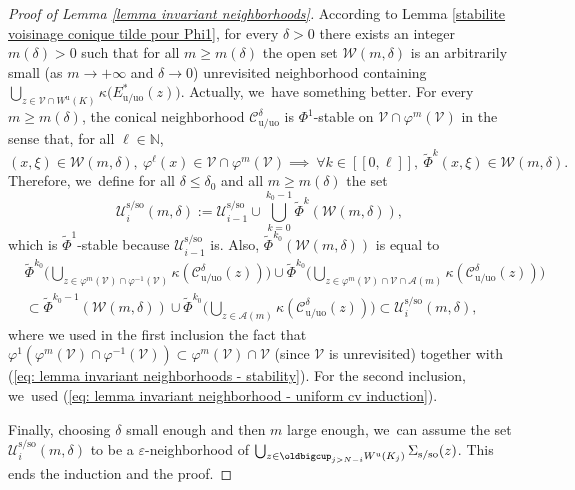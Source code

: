 \documentclass[JEP,XML,SOM,Unicode,NoEqCountersInSection,NoFloatCountersInSection,published]{cedram}
\newcommand{\lcr}{[\![}
\newcommand{\rcr}{]\!]}
\newcommand{\rs}{\mathrm{s}}
\newcommand{\rso}{\mathrm{so}}
\newcommand{\ru}{\mathrm{u}}
\newcommand{\ruo}{\mathrm{uo}}
\theoremstyle{definition}
\theoremstyle{plain}
\newcommand{\Acal}{\mathcal{A}}
\newcommand{\Ccal}{\mathcal{C}}
\newcommand{\N}{\mathbb{N}}
\newcommand{\Ucal}{\mathcal{U}}
\newcommand{\Vcal}{\mathcal{V}}
\newcommand{\Wcal}{\mathcal{W}}
\begin{document}
\begin{proof}[Proof of Lemma \ref{lemma invariant neighborhoods}]
According to Lemma \ref{stabilite voisinage conique tilde pour Phi1}, for every $\delta > 0$ there exists an integer $m(\delta) > 0$ such that for all $m \geq m (\delta)$ the open set $\Wcal(m,\delta)$ is an arbitrarily small (as $m \to + \infty$ and $\delta \to 0$) unrevisited neighborhood containing $\bigcup_{z \in \Vcal\cap W^\ru (K)} \kappa \bigl(E_{\ru/\ruo}^* (z) \bigr)$. Actually, we~have something better. For every $m \geq m(\delta)$, the conical neighborhood $\Ccal_{\ru/\ruo}^{\delta}$ is $\Phi^1$-stable on $\Vcal \cap \varphi^m (\Vcal)$ in the sense that, for all $\ell \in \N$,
\begin{equation}\label{eq: lemma invariant neighborhoods - stability}
(x,\xi) \in \Wcal (m,\delta), \: \varphi^{\ell} (x) \in \Vcal \cap \varphi^{m} (\Vcal) \implies \: \forall k \in \lcr0, \ell \rcr, \: \widetilde{\Phi}^k (x,\xi) \in \Wcal (m,\delta).
\end{equation}
Therefore, we~define for all $\delta \leq \delta_0$ and all $m \geq m (\delta)$ the set
\[
\Ucal_i^{\rs/\rso} (m,\delta):= \Ucal_{i-1}^{\rs/\rso} \cup \bigcup_{k = 0}^{k_0 - 1} \widetilde{\Phi}^k (\Wcal (m,\delta)),
\]
which is $\widetilde{\Phi}^1$-stable because $\Ucal_{i-1}^{\rs/\rso}$ is. Also, $\widetilde{\Phi}^{k_0} (\Wcal (m,\delta))$ is equal to
\begin{align*}
& \widetilde{\Phi}^{k_0 } \biggl(\bigcup_{z \in \varphi^{m} (\Vcal) \cap \varphi^{-1} (\Vcal)} \kappa (\Ccal_{\ru/\ruo}^{\delta}(z)) \biggr) \cup \widetilde{\Phi}^{k_0} \biggl(\bigcup_{z \in \varphi^m (\Vcal) \cap \Vcal \cap \Acal (m)} \kappa (\Ccal_{\ru/\ruo}^{\delta}(z)) \biggr) \\
&\subset \widetilde{\Phi}^{k_0 -1} \left(\Wcal (m,\delta) \right) \cup \widetilde{\Phi}^{k_0} \biggl(\bigcup_{z \in \Acal (m)} \kappa (\Ccal_{\ru/\ruo}^{\delta}(z)) \biggr) \subset \Ucal_i^{\rs/\rso} (m,\delta),
\end{align*}
where we used in the first inclusion the fact that $\varphi^{1} (\varphi^m (\Vcal) \cap \varphi^{-1} (\Vcal)) \subset \varphi^m (\Vcal) \cap \Vcal$ (since $\Vcal$ is unrevisited) together with (\ref{eq: lemma invariant neighborhoods - stability}). For the second inclusion, we~used (\ref{eq: lemma invariant neighborhood - uniform cv induction}).

Finally, choosing $\delta$ small enough and then $m$ large enough, we~can assume the set $\Ucal_i^{\rs/\rso} (m,\delta)$ to be a $\varepsilon$-neighborhood of $\bigcup_{z \in \oldbigcup_{j > N-i} W^\ru (K_j)} \Sigma_{\rs/\rso} (z)$. This ends the induction and the proof.
\end{proof}
\end{document}
